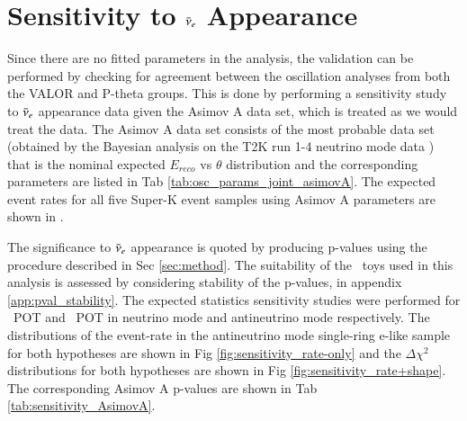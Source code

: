 \clearpage

\section {Sensitivity to $\bar{\nu}_{e}$ Appearance}
\label{sec:sensitivity}
Since there are no fitted parameters in the analysis, the validation can be performed by checking for agreement between the oscillation analyses from both the VALOR and P-theta groups. This is done by performing a sensitivity study to $\bar{\nu}_{e}$ appearance data given the Asimov A data set, which is treated as we would treat the data. The Asimov A data set consists of the most probable data set (obtained by the Bayesian analysis on the T2K run 1-4 neutrino mode data \cite{T2KLongPaper}) that is the nominal expected $E_{reco}$ vs $\theta$ distribution \cite{Asimov} and the corresponding parameters are listed in Tab \ref{tab:osc_params_joint_asimovA}. The expected event rates for all five Super-K event samples using Asimov A parameters are shown in .  %







The significance to $\bar{\nu}_{e}$ appearance is quoted by producing p-values using the procedure described in Sec \ref{sec:method}. The suitability of the \NToysFakeDataRatePlusShape\ toys used in this analysis is assessed by considering stability of the p-values, in appendix \ref{app:pval_stability}. %
The expected \RunPeriod statistics sensitivity studies were performed for \TotalPotNuRunOneNineC\ POT and \TotalPotNuBarRunOneNineC\ POT in neutrino mode and antineutrino mode respectively. The distributions of the event-rate in the antineutrino mode single-ring e-like sample for both hypotheses are shown in Fig \ref{fig:sensitivity_rate-only} and the $\Delta \chi^2$ distributions for both hypotheses are shown in Fig \ref{fig:sensitivity_rate+shape}. The corresponding Asimov A p-values are shown in Tab \ref{tab:sensitivity_AsimovA}.

